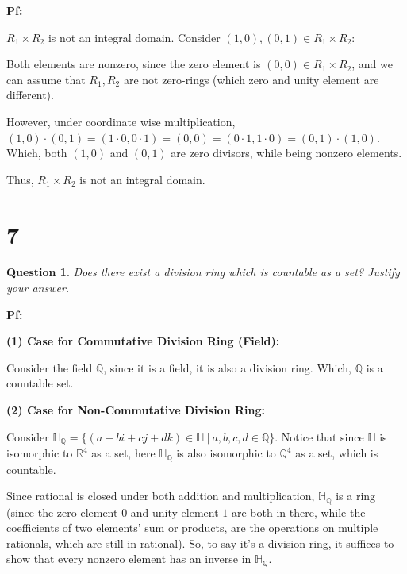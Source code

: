 \documentclass{article}
\newtheorem{question}{Question}
\begin{document}
\textbf{Pf:}

$R_1\times R_2$ is not an integral domain. Consider $(1,0),(0,1)\in R_1\times R_2$:

Both elements are nonzero, since the zero element is $(0,0)\in R_1\times R_2$, and we can assume that $R_1,R_2$ are not zero-rings 
(which zero and unity element are different).

However, under coordinate wise multiplication, $(1,0)\cdot(0,1)=(1\cdot0 ,0\cdot 1) = (0,0) = (0\cdot 1,1\cdot 0) = (0,1)\cdot(1,0)$.
Which, both $(1,0)$ and $(0,1)$ are zero divisors, while being nonzero elements.

Thus, $R_1\times R_2$ is not an integral domain.

\hfill

\hfill

\section*{7}
\begin{myBox}[]{}
    \begin{question}
        Does there exist a division ring which is countable as a set? Justify your answer.
    \end{question}
\end{myBox}

\textbf{Pf:}

\textbf{(1) Case for Commutative Division Ring (Field):}

Consider the field $\mathbb{Q}$, since it is a field, it is also a division ring. Which, $\mathbb{Q}$ is a countable set.

\hfill

\textbf{(2) Case for Non-Commutative Division Ring:}

Consider $\mathbb{H}_{\mathbb{Q}} = \{(a+bi+cj+dk)\in \mathbb{H}\ |\ a,b,c,d\in \mathbb{Q}\}$. Notice that since $\mathbb{H}$ is isomorphic to $\mathbb{R}^4$ as a set,
here $\mathbb{H}_{\mathbb{Q}}$ is also isomorphic to $\mathbb{Q}^4$ as a set, which is countable.

\hfill

Since rational is closed under both addition and multiplication, $\mathbb{H_Q}$ is a ring (since the zero element $0$ and unity element $1$ are both in there, 
while the coefficients of two elements' sum or products, are the operations on multiple rationals, which are still in rational). So, to say it's a division ring, 
it suffices to show that every nonzero element has an inverse in $\mathbb{H_Q}$.
\end{document}
